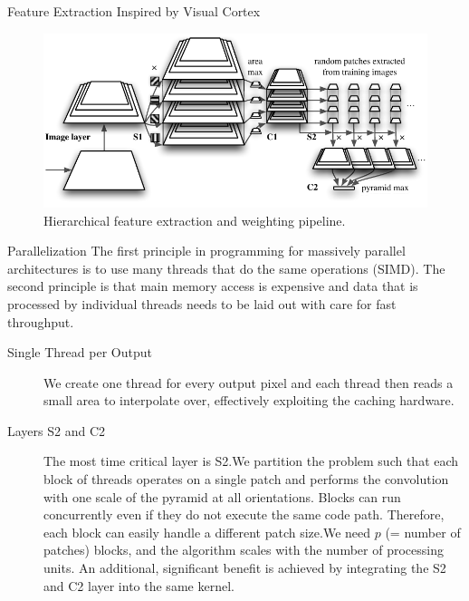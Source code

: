 \documentclass[final]{beamer}
\begin{document}
\begin{frame}{}
\begin{columns}[t]
\begin{column}{.48\linewidth}
\begin{block} {Feature Extraction Inspired by Visual Cortex}
\begin{figure}[tb]
\centering
\includegraphics[width=.7\linewidth]{images/pyramidp}
\caption{
  Hierarchical feature extraction and weighting pipeline.
}
\label{fig:pyramid}
\end{figure}
        \end{block}
        \begin{block}{Parallelization}
The first principle in programming for massively parallel architectures is to use many threads that do the same operations (SIMD). The second principle is that main memory access is expensive and data that is processed by individual threads needs to be laid out with care for fast throughput. 
\begin{description}
\item[ Single Thread per Output] 
We create one thread for every output pixel and each thread
then reads a small area to interpolate over, effectively exploiting
the caching hardware.

\item [ Layers S2 and C2]
The most time critical layer is S2.We partition the problem such that each block of threads operates on a
single patch and performs the convolution with one scale of the
pyramid at all orientations. Blocks can run concurrently even if they do not execute the same code path. 
Therefore, each block can easily handle a different patch size.We need $p$ (= number of patches) blocks, and the algorithm scales
with the number of processing units. \newline
An additional, significant benefit is achieved by integrating the S2
and C2 layer into the same kernel.

\end{description}

        \end{block}        
        
        
      \end{column}
      
      

\end{columns}
\end{frame}
\end{document}
